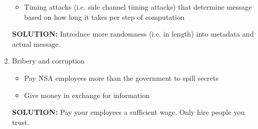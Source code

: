 \documentclass[11pt]{article}
\begin{document}
\begin{enumerate}
\begin{itemize}
	\item Timing attacks (i.e. side channel timing attacks) that determine message based on how long it takes per step of computation
	\end{itemize}
	\textbf{SOLUTION: } Introduce more randomness (i.e. in length) into metadata and actual message.
\item Bribery and corruption
	\begin{itemize}
	\item Pay NSA employees more than the government to spill secrets
	\item Give money in exchange for information
	\end{itemize}
	\textbf{SOLUTION: } Pay your employees a sufficient wage. Only hire people you trust.
\end{enumerate}
\end{document}
